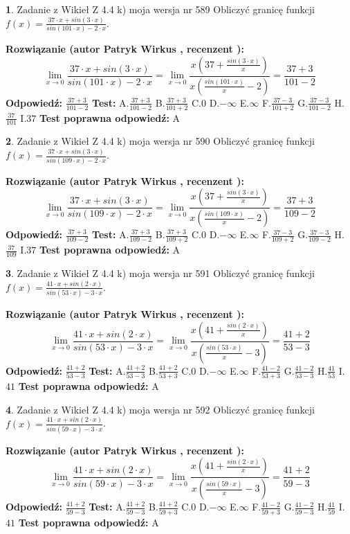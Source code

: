 \documentclass[12pt, a4paper]{article}
\theoremstyle{definition} %
\newtheorem{zad}{}
\newcommand{\zadStart}[1]{\begin{zad}#1\newline}
\newcommand{\zadStop}{\end{zad}}
\newcommand{\rozwStart}[2]{\noindent \textbf{Rozwiązanie (autor #1 , recenzent #2): }\newline}
\newcommand{\rozwStop}{\newline}
\newcommand{\odpStart}{\noindent \textbf{Odpowiedź:}\newline}
\newcommand{\odpStop}{\newline}
\newcommand{\testStart}{\noindent \textbf{Test:}\newline}
\newcommand{\testStop}{\newline}
\newcommand{\kluczStart}{\noindent \textbf{Test poprawna odpowiedź:}\newline}
\newcommand{\kluczStop}{\newline}
\begin{document}
\zadStart{Zadanie z Wikieł Z 4.4 k) moja wersja nr 589}
Obliczyć granicę funkcji $f(x)=\frac{37\cdot x +sin(3\cdot x)}{sin(101\cdot x) -2\cdot x}$.
\zadStop
\rozwStart{Patryk Wirkus}{}
$$\lim\limits_{x\to 0}\frac{37\cdot x +sin(3\cdot x)}{sin(101\cdot x) -2\cdot x}
=\lim\limits_{x\to 0}\frac{x(37+\frac{sin(3\cdot x)}{x})}{x(\frac{sin(101\cdot x)}{x}-2)}
=\frac{37+3}{101-2}$$
\rozwStop
\odpStart
$\frac{37+3}{101-2}$
\odpStop
\testStart
A.$\frac{37+3}{101-2}$
B.$\frac{37+3}{101+2}$
C.$0$
D.$-\infty$
E.$\infty$
F.$\frac{37-3}{101+2}$
G.$\frac{37-3}{101-2}$
H.$\frac{37}{101}$
I.$37$
\testStop
\kluczStart
A
\kluczStop



\zadStart{Zadanie z Wikieł Z 4.4 k) moja wersja nr 590}
Obliczyć granicę funkcji $f(x)=\frac{37\cdot x +sin(3\cdot x)}{sin(109\cdot x) -2\cdot x}$.
\zadStop
\rozwStart{Patryk Wirkus}{}
$$\lim\limits_{x\to 0}\frac{37\cdot x +sin(3\cdot x)}{sin(109\cdot x) -2\cdot x}
=\lim\limits_{x\to 0}\frac{x(37+\frac{sin(3\cdot x)}{x})}{x(\frac{sin(109\cdot x)}{x}-2)}
=\frac{37+3}{109-2}$$
\rozwStop
\odpStart
$\frac{37+3}{109-2}$
\odpStop
\testStart
A.$\frac{37+3}{109-2}$
B.$\frac{37+3}{109+2}$
C.$0$
D.$-\infty$
E.$\infty$
F.$\frac{37-3}{109+2}$
G.$\frac{37-3}{109-2}$
H.$\frac{37}{109}$
I.$37$
\testStop
\kluczStart
A
\kluczStop



\zadStart{Zadanie z Wikieł Z 4.4 k) moja wersja nr 591}
Obliczyć granicę funkcji $f(x)=\frac{41\cdot x +sin(2\cdot x)}{sin(53\cdot x) -3\cdot x}$.
\zadStop
\rozwStart{Patryk Wirkus}{}
$$\lim\limits_{x\to 0}\frac{41\cdot x +sin(2\cdot x)}{sin(53\cdot x) -3\cdot x}
=\lim\limits_{x\to 0}\frac{x(41+\frac{sin(2\cdot x)}{x})}{x(\frac{sin(53\cdot x)}{x}-3)}
=\frac{41+2}{53-3}$$
\rozwStop
\odpStart
$\frac{41+2}{53-3}$
\odpStop
\testStart
A.$\frac{41+2}{53-3}$
B.$\frac{41+2}{53+3}$
C.$0$
D.$-\infty$
E.$\infty$
F.$\frac{41-2}{53+3}$
G.$\frac{41-2}{53-3}$
H.$\frac{41}{53}$
I.$41$
\testStop
\kluczStart
A
\kluczStop



\zadStart{Zadanie z Wikieł Z 4.4 k) moja wersja nr 592}
Obliczyć granicę funkcji $f(x)=\frac{41\cdot x +sin(2\cdot x)}{sin(59\cdot x) -3\cdot x}$.
\zadStop
\rozwStart{Patryk Wirkus}{}
$$\lim\limits_{x\to 0}\frac{41\cdot x +sin(2\cdot x)}{sin(59\cdot x) -3\cdot x}
=\lim\limits_{x\to 0}\frac{x(41+\frac{sin(2\cdot x)}{x})}{x(\frac{sin(59\cdot x)}{x}-3)}
=\frac{41+2}{59-3}$$
\rozwStop
\odpStart
$\frac{41+2}{59-3}$
\odpStop
\testStart
A.$\frac{41+2}{59-3}$
B.$\frac{41+2}{59+3}$
C.$0$
D.$-\infty$
E.$\infty$
F.$\frac{41-2}{59+3}$
G.$\frac{41-2}{59-3}$
H.$\frac{41}{59}$
I.$41$
\testStop
\kluczStart
A
\kluczStop
\end{document}
